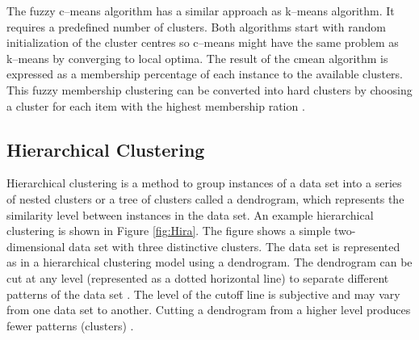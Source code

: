 The fuzzy c--means algorithm has a similar approach as k--means algorithm. It requires a predefined number of clusters. Both algorithms start with random initialization of the cluster centres so c--means might have the same problem as k--means by converging to local optima. The result of the cmean algorithm is expressed as a membership percentage of each instance to the available clusters. This fuzzy membership clustering can be converted into hard clusters by choosing a cluster for each item with the highest membership ration \cite{Wang2006}.

\subsection{Hierarchical Clustering}

Hierarchical clustering is a method to group instances of a data set into a series of nested clusters or a tree of clusters called a dendrogram, which represents the similarity level between instances in the data set. An example hierarchical clustering is shown in Figure \ref{fig:Hira}. The figure shows a simple two-dimensional data set with three distinctive clusters. The data set is represented as in a hierarchical clustering model using a dendrogram. The dendrogram can be cut at any level (represented as a dotted horizontal line) to separate different patterns of the data set \cite{Jain1999}. The level of the cutoff line is subjective and may vary from one data set to another. Cutting a dendrogram from a higher level produces fewer patterns (clusters) \cite{Wang2006}.

